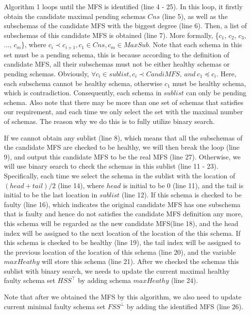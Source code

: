 \documentclass{sig-alternate-05-2015}
\begin{document}
{{Algorithm 1 loops until the MFS is identified (line 4 - 25). In this loop, it firstly obtain the candidate maximal pending schemas $Cns$ (line 5), as well as the subschemas of the candidate MFS with the biggest degree (line 6). Then,  a list of subschemas of this candidate MFS is obtained (line 7). More formally, \{$c_{1}$, $c_{2}$, $c_{3}$, ..., $c_{m}$\}, where $c_{i} \prec c_{i+1}, c_{1} \in Cns, c_{m} \in MaxSub$.  Note that each schema in this set must be a pending schema, this is because according to the definition of candidate MFS, all their subschemas must not be either healthy schemas or pending schemas.  Obviously, $\forall c_{i} \in sublist, c_{i} \prec CandiMFS, \ and\  c_{1} \preceq c_{i}$.  Here, each subschema cannot be healthy schema, otherwise $c_{1}$ must be healthy schema, which is contradiction. Consequently, each schema in $sublist$ can only be pending schema. Also note that there may be more than one set of schemas that satisfies our requirement, and each time we only select the set with the maximal number of schemas. The reason why we do this is to fully utilize binary search.
 
If we cannot obtain any sublist (line 8), which means that all the subschemas of the candidate MFS are checked to be healthy, we will then break the loop (line 9), and output this candidate MFS to be the real MFS (line 27). Otherwise, we will use binary search to check the schemas in this sublist (line 11 - 23). Specifically, each time we select the schema in the sublist with the location of $(head + tail) / 2$ (line 14), where $head$ is initial to be 0 (line 11), and the tail is initial to be the last location in $sublist$ (line 12). If this schema is checked to be faulty (line 16), which indicates the original candidate MFS has one subschema that is faulty and hence do not satisfies the candidate MFS definition any more, this schema will be regarded as the new candidate MFS(line 18), and the head index will be assigned to the next location of the location of the this schema.  If this schema is checked to be healthy (line 19), the tail index will be assigned to the previous location of the location of this schema (line 20), and the variable $maxHeathy$ will store this schema (line 21).  After we checked the schemas this sublist with binary search, we needs to update the current maximal healthy faulty schema set $HSS^{\top}$ by adding schema $maxHeathy$ (line 24).


Note that after we obtained the MFS by this algorithm, we also need to update current minimal faulty schema set $FSS^{\bot}$ by adding the identified MFS (line 26).


}}
\end{document}
